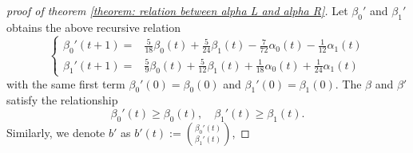 \documentclass{article}
\begin{document}
\begin{proof}[proof of theorem \ref{theorem: relation between alpha L and alpha R}]
    Let $\beta_0'$ and $\beta_1'$ obtains the above recursive relation
    \begin{equation}
        \begin{cases}
            \beta_0'(t+1) =& \frac{5}{18} \beta_0(t)+\frac{5}{24} \beta_1(t)-\frac{7}{72} \alpha_0(t)-\frac{1}{12} \alpha_1(t) \\
        \beta_1'(t+1)  =& \frac{5}{9} \beta_0(t)+\frac{5}{12} \beta_1(t)+\frac{1}{18} \alpha_0(t)+\frac{1}{24} \alpha_1(t)
        \end{cases}
        \label{eq: zz anonymous 25}
    \end{equation}
    with the same first term $\beta_0'(0) = \beta_0(0)$ and $\beta_1'(0) = \beta_1(0)$. The $\beta$ and $\beta'$ satisfy the relationship
    \begin{equation}
        \beta_0'(t) \geq \beta_0(t),\quad  \beta_1'(t) \geq \beta_1(t).
    \end{equation}
    Similarly, we denote $b'$ as $b'(t):=\binom{\beta_0'(t)}{\beta_1'(t)}$,
    

\end{proof}
\end{document}
